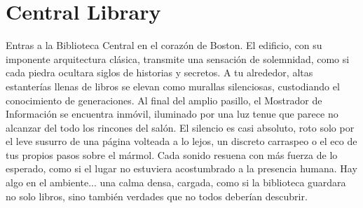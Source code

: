 \section{Central Library} 

Entras a la Biblioteca Central en el corazón de Boston. El
edificio, con su imponente arquitectura clásica, transmite una sensación de
solemnidad, como si cada piedra ocultara siglos de historias y secretos. A tu
alrededor, altas estanterías llenas de libros se elevan como murallas
silenciosas, custodiando el conocimiento de generaciones. Al final del amplio
pasillo, el Mostrador de Información se encuentra inmóvil, iluminado por una
luz tenue que parece no alcanzar del todo los rincones del salón. El silencio
es casi absoluto, roto solo por el leve susurro de una página volteada a lo
lejos, un discreto carraspeo o el eco de tus propios pasos sobre el mármol.
Cada sonido resuena con más fuerza de lo esperado, como si el lugar no
estuviera acostumbrado a la presencia humana. Hay algo en el ambiente... una
calma densa, cargada, como si la biblioteca guardara no solo libros, sino
también verdades que no todos deberían descubrir.
